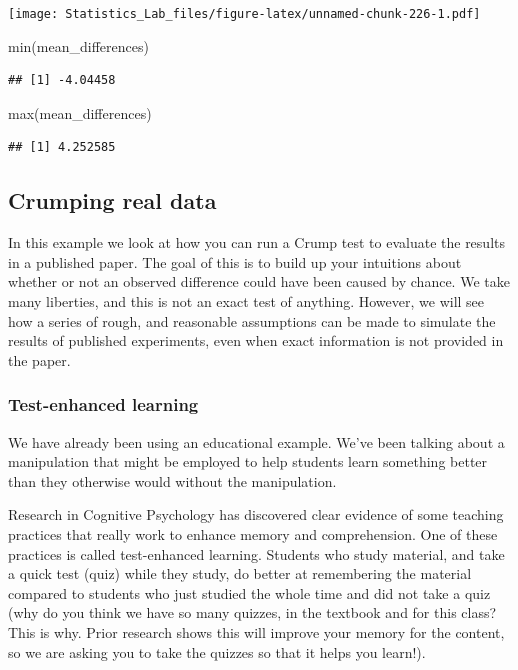 \documentclass[
]{book}
\newenvironment{Shaded}{\begin{snugshade}}{\end{snugshade}}
\newcommand{\FunctionTok}[1]{\textcolor[rgb]{0.00,0.00,0.00}{#1}}
\newcommand{\NormalTok}[1]{#1}
\begin{document}
\texttt{[image: Statistics\_Lab\_files/figure-latex/unnamed-chunk-226-1.pdf]}

\begin{Shaded}
\begin{Highlighting}[]
\FunctionTok{min}\NormalTok{(mean\_differences)}
\end{Highlighting}
\end{Shaded}

\begin{verbatim}
## [1] -4.04458
\end{verbatim}

\begin{Shaded}
\begin{Highlighting}[]
\FunctionTok{max}\NormalTok{(mean\_differences)}
\end{Highlighting}
\end{Shaded}

\begin{verbatim}
## [1] 4.252585
\end{verbatim}

\hypertarget{crumping-real-data}{%
\subsection{Crumping real data}\label{crumping-real-data}}

In this example we look at how you can run a Crump test to evaluate the results in a published paper. The goal of this is to build up your intuitions about whether or not an observed difference could have been caused by chance. We take many liberties, and this is not an exact test of anything. However, we will see how a series of rough, and reasonable assumptions can be made to simulate the results of published experiments, even when exact information is not provided in the paper.

\hypertarget{test-enhanced-learning}{%
\subsubsection{Test-enhanced learning}\label{test-enhanced-learning}}

We have already been using an educational example. We've been talking about a manipulation that might be employed to help students learn something better than they otherwise would without the manipulation.

Research in Cognitive Psychology has discovered clear evidence of some teaching practices that really work to enhance memory and comprehension. One of these practices is called test-enhanced learning. Students who study material, and take a quick test (quiz) while they study, do better at remembering the material compared to students who just studied the whole time and did not take a quiz (why do you think we have so many quizzes, in the textbook and for this class? This is why. Prior research shows this will improve your memory for the content, so we are asking you to take the quizzes so that it helps you learn!).
\end{document}
